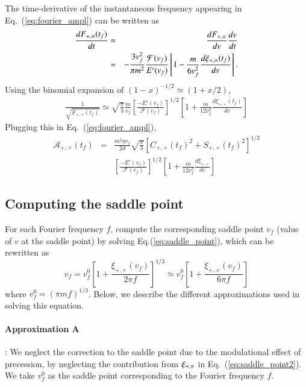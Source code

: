 \documentclass[prd,preprintnumbers,twocolumn,eqsecnum,floatfix,letter]{revtex4}
\begin{document}
The time-derivative of the instantaneous frequency appearing in Eq.~(\ref{eq:fourier_ampl}) can be written as 
%
\begin{eqnarray}
\frac{dF_{+,\times}(t_f)}{dt} & = & \frac{dF_{+,\times}}{dv} \frac{dv}{dt} \nonumber \\
 & = & -\frac{3v_f^2}{\pi m^2} \frac{\mathcal{F}(v_f)}{E'(v_f)}\left[1-\frac{m}{6v_f^2}\frac{d\xi_{+,\times}(t_f)}{dv} \right].
\end{eqnarray}
%
Using the binomial expansion of $(1-x)^{-1/2} \simeq (1+x/2)$, 
%
\begin{eqnarray}
\frac{1}{\sqrt{\dot{F}_{+,\times}(t_f)}} \simeq \sqrt{\frac{\pi}{3}} \frac{m}{v_f} \left[\frac{-E'(v_f)}{\mathcal{F}(v_f)} \right]^{1/2} \left[1+\frac{m}{12v_f^2} \frac{d\xi_{+,\times}(t_f)}{dv}\right]
\end{eqnarray}
%
Plugging this in Eq.~(\ref{eq:fourier_ampl}),
%
\begin{eqnarray}
\mathcal{A}_{+,\times}(t_f) & = &  \frac{m^2\eta v_f}{2d} \sqrt{\frac{\pi}{3}} \left[C_{+,\times}(t_f)^2 + S_{+,\times}(t_f)^2 \right]^{1/2} \nonumber \\ 
& & \left[\frac{-E'(v_f)}{\mathcal{F}(v_f)} \right]^{1/2} \left[1+ \frac{m}{12 v_f^2} \frac{d\xi_{+,\times}}{dv}\right]
\label{eq:spa_amp}
\end{eqnarray}
%
\subsection{Computing the saddle point}

For each Fourier frequency $f$, compute the corresponding saddle point $v_f$ (value of $v$ at the saddle point) by solving Eq.(\ref{eq:saddle_point}), which can be rewritten as 
%
\begin{equation}
v_f = v_f^0 \left[1+ \frac{\xi_{+,\times}(v_f)}{2\pi f} \right]^{1/3} \simeq  v_f^0 \left[1+ \frac{\xi_{+,\times}(v_f)}{6\pi f} \right]
\label{eq:saddle_point2}
\end{equation}
% 
where $v_f^0 = (\pi m f)^{1/3}$. Below, we describe the different approximations used in solving this equation. 

\paragraph{\textbf{Approximation A}}: We neglect the correction to the saddle point due to the modulational effect of precession, by neglecting the contribution from $\xi_{+,\times}$ in Eq.~(\ref{eq:saddle_point2}). We take $v_f^0$ as the saddle point corresponding to the Fourier frequency $f$. 
\end{document}
